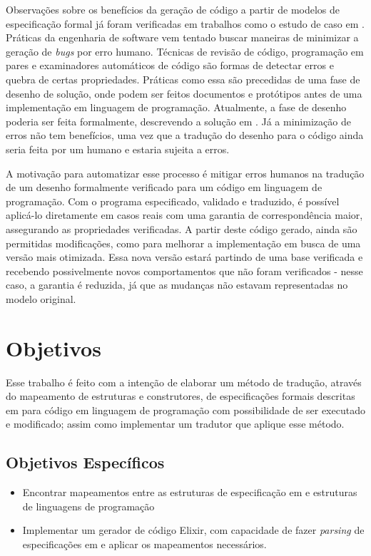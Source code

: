 Observações sobre os benefícios da geração de código a partir de modelos de especificação formal já foram verificadas em trabalhos como o estudo de caso em \cite{Leonard2008}. Práticas da engenharia de software vem tentado buscar maneiras de minimizar a geração de \textit{bugs} por erro humano. Técnicas de revisão de código, programação em pares e examinadores automáticos de código são formas de detectar erros e quebra de certas propriedades. Práticas como essa são precedidas de uma fase de desenho de solução, onde podem ser feitos documentos e protótipos antes de uma implementação em linguagem de programação. Atualmente, a fase de desenho poderia ser feita formalmente, descrevendo a solução em \TLA. Já a minimização de erros não tem benefícios, uma vez que a tradução do desenho para o código ainda seria feita por um humano e estaria sujeita a erros.

A motivação para automatizar esse processo é mitigar erros humanos na tradução de um desenho formalmente verificado para um código em linguagem de programação. Com o programa especificado, validado e traduzido, é possível aplicá-lo diretamente em casos reais com uma garantia de correspondência maior, assegurando as propriedades verificadas. A partir deste código gerado, ainda são permitidas modificações, como para melhorar a implementação em busca de uma versão mais otimizada. Essa nova versão estará partindo de uma base verificada e recebendo possivelmente novos comportamentos que não foram verificados - nesse caso, a garantia é reduzida, já que as mudanças não estavam representadas no modelo original.

\section{Objetivos}

Esse trabalho é feito com a intenção de elaborar um método de tradução, através do mapeamento de estruturas e construtores, de especificações formais descritas em \TLA para código em linguagem de programação com possibilidade de ser executado e modificado; assim como implementar um tradutor que aplique esse método.

\subsection{Objetivos Específicos}
\begin{itemize}
  \item Encontrar mapeamentos entre as estruturas de especificação em \TLA e estruturas de linguagens de programação
  \item Implementar um gerador de código Elixir, com capacidade de fazer \textit{parsing} de especificações em \TLA e aplicar os mapeamentos necessários.
\end{itemize}
